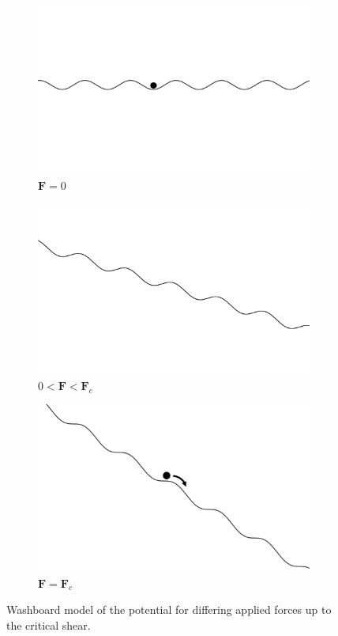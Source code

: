 \documentclass{article}
\numberwithin{equation}{section}
\begin{document}
\begin{figure}[htb]
\centering
\begin{subfigure}[t]{.33\textwidth}
  \centering
  \includegraphics[width=.9\linewidth]{results/Figures/washboard-f0.png}
  \caption{$\mathbf{F}=0$}
  \label{fig:washboard_f0}
\end{subfigure}
\hfill
\begin{subfigure}[t]{.33\textwidth}
  \centering
  \includegraphics[width=.9\linewidth]{results/Figures/washboard-f.png}
  \caption{$0<\mathbf{F}<\mathbf{F}_c$}
  \label{fig:washboard_f}
\end{subfigure}
\hfill
\begin{subfigure}[t]{.33\textwidth}
  \centering
  \includegraphics[width=.9\linewidth]{results/Figures/washboard-fc.png}
  \caption{$\mathbf{F}=\mathbf{F}_c$}
  \label{fig:washboard_fc}
\end{subfigure}
\caption{Washboard model of the potential for differing applied forces up to the critical shear.}
\label{fig:washboard}
\end{figure}
\end{document}
